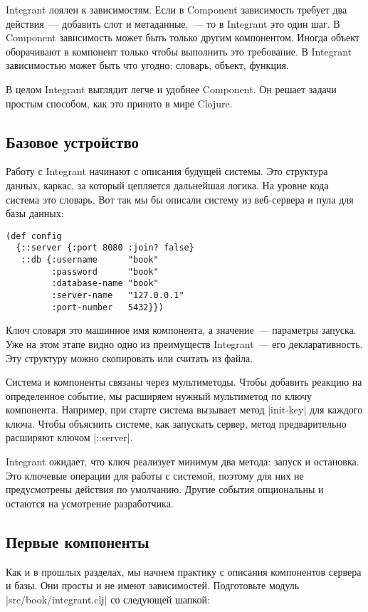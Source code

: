 Integrant лоялен к зависимостям. Если в Component зависимость требует два
действия~--- добавить слот и метаданные,~--- то в Integrant это один шаг. В
Component зависимость может быть только другим компонентом. Иногда объект
оборачивают в компонент только чтобы выполнить это требование. В Integrant
зависимостью может быть что угодно: словарь, объект, функция.

В целом Integrant выглядит легче и удобнее Component. Он решает задачи простым
способом, как это принято в мире Clojure.

\subsection{Базовое устройство}

Работу с Integrant начинают с описания будущей системы. Это структура данных,
каркас, за который цепляется дальнейшая логика. На уровне кода система это
словарь. Вот так мы бы описали систему из веб-сервера и пула для базы данных:

\begin{verbatim}
(def config
  {::server {:port 8080 :join? false}
   ::db {:username      "book"
         :password      "book"
         :database-name "book"
         :server-name   "127.0.0.1"
         :port-number   5432}})
\end{verbatim}

Ключ словаря это машинное имя компонента, а значение~--- параметры запуска. Уже на
этом этапе видно одно из преимуществ Integrant~--- его декларативность. Эту
структуру можно скопировать или считать из файла.

Система и компоненты связаны через мультиметоды. Чтобы добавить реакцию на
определенное событие, мы расширяем нужный мультиметод по ключу
компонента. Например, при старте система вызывает метод \spverb|init-key| для каждого
ключа. Чтобы объяснить системе, как запускать сервер, метод предварительно
расширяют ключом \spverb|::server|.

Integrant ожидает, что ключ реализует минимум два метода: запуск и
остановка. Это ключевые операции для работы с системой, поэтому для них не
предусмотрены действия по умолчанию. Другие события опциональны и остаются на
усмотрение разработчика.

\subsection{Первые компоненты}

Как и в прошлых разделах, мы начнем практику с описания компонентов сервера и
базы. Они просты и не имеют зависимостей. Подготовьте модуль
\spverb|src/book/integrant.clj| со следующей шапкой:

